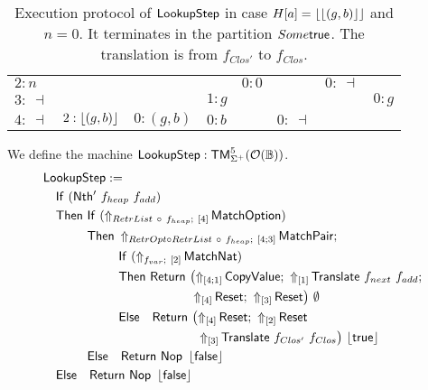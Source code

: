 \begin{table}[t!]
\begin{tabular}{l||l|l|l|l|l|l|l}
    $2:n$       &                  &                       &                      & $0:0$           &              & $0:~\dashv$  &                  \\
    $3:~\dashv$ &                  &                       & $1: g$               &                 &              &              & $0:g$            \\
    $4:~\dashv$ & $2:\left\lfloor {(g,b)} \right\rfloor$ & $0:(g,b)$             & $0:b$                &                 & $0:~\dashv$  &              &                  \\
  \end{tabular}
  \caption{Execution protocol of $\mathsf{LookupStep}$ in case $H[a] = \left\lfloor {\left\lfloor {(g,b)} \right\rfloor} \right\rfloor$ and $n=0$.  It terminates in the partition $Some\mathsf{true}$.  The
    translation is from $f_{Clos'}$ to $f_{Clos}$.}
  \label{tab:exec-LookupStep-0}
\end{table}

\begin{definition}
  \label{def:Lookup_Step}
  We define the machine $\mathsf{LookupStep} : \mathsf{TM}_{\Sigma^+}^5(\mathcal{O}(\mathbb{B}))$.
  \begin{align*}
    & \MS{LookupStep} := \\
    & \quad \MS{If}~(\MS{Nth'}~f_{heap}~f_{add}) \\
    & \quad \MS{Then}~\MS{If}~(\LiftBoth{\MS{MatchOption}}{RetrList ~\circ~ f_{heap}}{\Vector{4}}) \\
    & \quad \phantom{\MS{Then}}~\MS{Then}~\LiftBoth{\MS{MatchPair}}{RetrOpt \circ RetrList ~\circ~ f_{heap}}{\Vector{4;3}} \Seq \\
    & \quad \phantom{\MS{Then}~\MS{Then}}~\MS{If}~(\LiftBoth{\MS{MatchNat}}{f_{var}}{\Vector{2}}) \\
    & \quad \phantom{\MS{Then}~\MS{Then}}~\MS{Then}~ \MS{Return}~\bigl(
      \LiftTapes{\MS{CopyValue}}{\Vector{4;1}} \Seq
      \LiftTapes{\MS{Translate}~f_{next}~f_{add}}{\Vector{1}} \Seq \\
    & \quad \phantom{\MS{Then}~\MS{Then}~\MS{Then}~\MS{Return}\bigl(}
      \LiftTapes{\MS{Reset}}{\Vector{4}} \Seq
      \LiftTapes{\MS{Reset}}{\Vector{3}}
      \bigr)~{\None} \\
    & \quad \phantom{\MS{Then}~\MS{Then}}~\MS{Else}~~~ \MS{Return}~\bigl(
      \LiftTapes{\MS{Reset}}{\Vector{4}} \Seq
      \LiftTapes{\MS{Reset}}{\Vector{2}} \\
    & \quad \phantom{\phantom{\MS{Then}~\MS{Then}}~\MS{Else}~~~\MS{Return}~\bigl(}
      \LiftTapes{\MS{Translate}~f_{Clos'}~f_{Clos}}{\Vector{3}}
      \bigr)~{\Some\true} \\
    & \quad \phantom{\MS{Then}}~\MS{Else}~~~ \Return{\Nop}{\Some\false} \\
    & \quad \MS{Else}~~~ \Return{\Nop}{\Some\false}
  \end{align*}
\end{definition}

